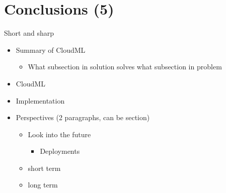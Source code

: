 \section{Conclusions (5)}

Short and sharp

\begin{itemize}
  \item Summary of CloudML
  \begin{itemize}
    \item What subsection in solution solves what subsection in problem
  \end{itemize}
  \item CloudML
  \item Implementation
  \item Perspectives (2 paragraphs, can be section)
    \begin{itemize}
      \item Look into the future
        \begin{itemize}
          \item Deployments
        \end{itemize}
      \item short term
      \item long term
    \end{itemize}

\end{itemize}
